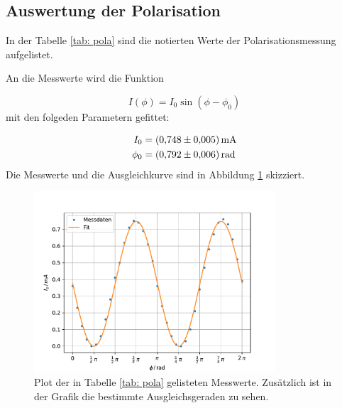 \subsection{Auswertung der Polarisation}

In der Tabelle \ref{tab: pola} sind die notierten Werte der Polarisationsmessung
aufgelistet.
\FloatBarrier

An die Messwerte wird die Funktion

\begin{equation}
  \label{eq: func_polarisation}
  I(\phi)=I_0\sin\left(\phi-\phi_0\right)
\end{equation}
mit den folgeden Parametern gefittet:

\begin{align}
  \label{eq: fit_pola}
  \begin{aligned}
  I_0&=\SI{0.748\pm0.005}{\milli\ampere}\\
  \phi_0&=\SI{0.792\pm0.006}{\radian}
\end{aligned}
\end{align}
Die Messwerte und die Ausgleichkurve sind in Abbildung \ref{fig: pola} skizziert.

\begin{figure}[h!]
  \centering
  \includegraphics[width=0.8\textwidth]{../Messdaten/plots/pola.pdf}
  \caption{Plot der in Tabelle \ref{tab: pola} gelisteten Messwerte. Zusätzlich ist in der Grafik die bestimmte Ausgleichsgeraden zu sehen.}
  \label{fig: pola}
\end{figure}
\FloatBarrier

